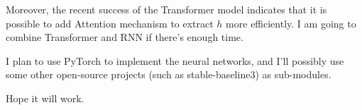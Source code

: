 Moreover, the recent success of the Transformer model \cite{vaswani_attention_2017} indicates that it is possible to add Attention mechanism to extract $h$ more efficiently. I am going to combine Transformer and RNN if there's enough time.

I plan to use PyTorch to implement the neural networks, and I'll possibly use some other open-source projects (such as stable-baseline3) as sub-modules.

Hope it will work.






